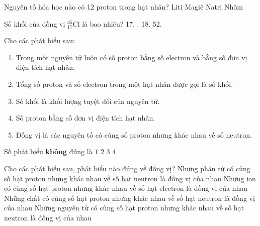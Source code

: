 \begin{ex}%
	Nguyên tố hóa học nào có 12 proton trong hạt nhân?
	\choice
	{Liti}
	{\True Magiê}
	{Natri}
	{Nhôm}
\end{ex}
\begin{ex}%
	Số khối của đồng vị $_{17}^{35}\text{Cl}$ là bao nhiêu?
	\choice
	{17.}
	{.}
	{18.}
	{52.}
\end{ex}
\begin{ex}%
	Cho các phát biểu sau:
	\begin{enumerate}[(1)]
		\item  Trong một nguyên tử luôn có số proton bằng số electron và bằng số đơn vị điện tích hạt nhân.
		\item  Tổng số proton và số electron trong một hạt nhân được gọi là số khối.
		\item  Số khối là khối lượng tuyệt đối của nguyên tử.
		\item  Số proton bằng số đơn vị điện tích hạt nhân.
		\item  Đồng vị là các nguyên tố có cùng số proton nhưng khác nhau về số neutron.
	\end{enumerate}
	Số phát biểu \textbf{không} đúng là
	\choice
	{$1$}
	{\True $2$}
	{$3$}
	{$4$}
\end{ex}
\begin{ex}%
	Cho các phát biểu sau, phát biểu nào đúng về đồng vị?
	\choice
	{Những phân tử có cùng số hạt proton nhưng khác nhau về số hạt neutron là đồng vị của nhau}
	{Những ion có cùng số hạt proton nhưng khác nhau về số hạt electron là đồng vị của nhau}
	{Những chất có cùng số hạt proton nhưng khác nhau về số hạt neutron là đồng vị của nhau}
	{\True Những nguyên tử có cùng số hạt proton nhưng khác nhau về số hạt neutron là đồng vị của nhau}
\end{ex}
